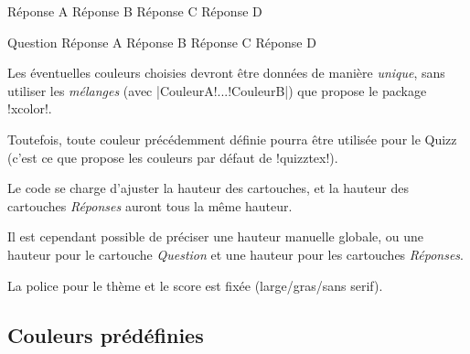 \documentclass[french,a4paper,11pt]{article}
\begin{document}
\begin{DemoCode}
	{Réponse A}
	{Réponse B}
	{Réponse C}
	{Réponse D}
\end{DemoCode}

\begin{DemoCode}
\QuizzPrendrePlace
	{Question}
	{Réponse A}
	{Réponse B}
	{Réponse C}
	{Réponse D}
\end{DemoCode}

\begin{tipblock}
Les éventuelles couleurs choisies devront être données de manière \textit{unique}, sans utiliser les \textit{mélanges} (avec \motcletex|CouleurA!...!CouleurB|) que propose le package \packagetex!xcolor!.

Toutefois, toute couleur précédemment définie pourra être utilisée pour le Quizz (c'est ce que propose les couleurs par défaut de \packagetex!quizztex!).
\end{tipblock}

\begin{importantblock}
Le code se charge d'ajuster la hauteur des cartouches, et la hauteur des cartouches \textit{Réponses} auront tous la même hauteur.

\smallskip

Il est cependant possible de préciser une hauteur manuelle globale, ou une hauteur pour le cartouche \textit{Question} et une hauteur pour les cartouches \textit{Réponses}.

\smallskip

La police pour le thème et le score est fixée (large/gras/sans serif).
\end{importantblock}

\subsection{Couleurs prédéfinies}
\end{document}
